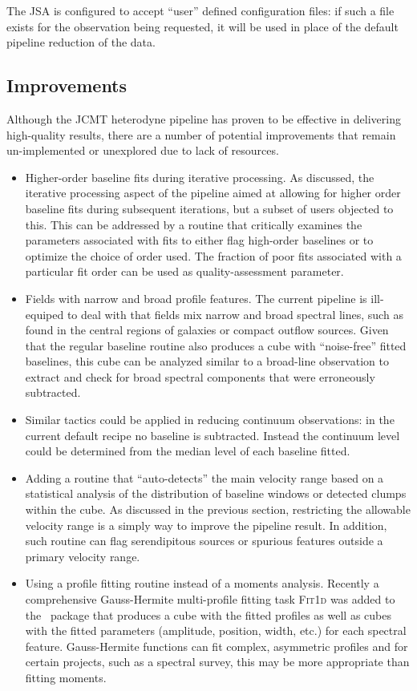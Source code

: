 \documentclass[final,authoryear,5p,times,twocolumn]{elsarticle}
\begin{document}
The JSA is configured to accept ``user'' defined configuration files: if such
a file exists for the observation being requested, it will be used in place of the default
pipeline reduction of the data.

\subsection{Improvements}

Although the JCMT heterodyne pipeline has proven to be effective in delivering
high-quality results, there are a number of potential improvements that remain
un-implemented or unexplored due to lack of resources.

\begin{itemize}
\item  Higher-order baseline fits during iterative processing. As discussed, the
iterative processing aspect of the pipeline aimed at allowing for higher order
baseline fits during subsequent iterations, but a subset of users objected
to this. This can be addressed by a routine that critically examines the
parameters associated with fits to either flag high-order baselines
or to optimize the choice of order used. The fraction of poor fits associated
with a particular fit order can be used as quality-assessment parameter.
\item Fields with narrow and broad profile features.  The current pipeline
is ill-equiped to deal with that fields mix narrow and broad spectral
lines, such as found in the central regions of galaxies or compact
outflow sources. Given that the regular baseline routine also produces a
cube with ``noise-free''  fitted baselines, this cube can be analyzed similar to a
broad-line observation to extract and check for broad
spectral components that were erroneously subtracted.
\item Similar tactics could be applied in reducing continuum observations:
in the current default recipe  no baseline is subtracted. Instead the continuum
level could be determined from the median level of each baseline fitted.
\item Adding a routine that ``auto-detects'' the main velocity range based
on a statistical analysis of the distribution of baseline windows or detected clumps
within the cube. As discussed in the previous section, restricting the allowable
velocity range is a simply way to improve the pipeline result. In addition,
such routine can flag serendipitous sources or spurious features outside
a primary velocity range.
\item Using a profile fitting routine instead of a moments analysis. Recently a
comprehensive Gauss-Hermite multi-profile fitting task \textsc{Fit{\footnotesize{1}}d}  was
added to the \smurf\ package that produces a cube with the fitted profiles as well
as cubes with the fitted parameters (amplitude, position, width, etc.) for
each spectral feature. Gauss-Hermite functions can fit complex, asymmetric
profiles and for certain projects, such as a spectral survey, this may be more
appropriate than fitting moments.
\end{itemize}
\end{document}
